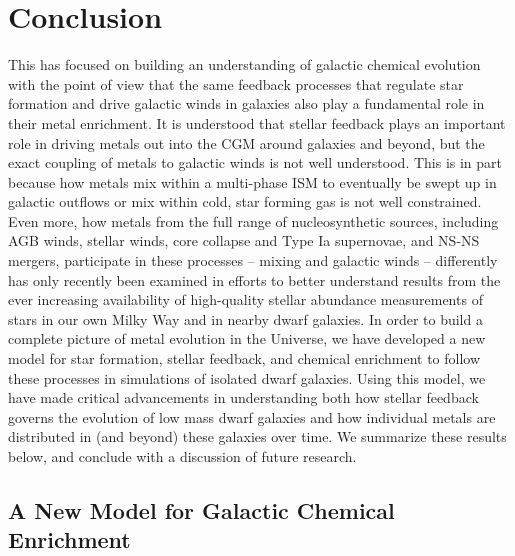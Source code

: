 \chapter[Conclusion]{Conclusion}
\label{ch:conclusion}


This \dissertation has focused on building an understanding of galactic chemical evolution with the point of view that the same feedback processes that regulate star formation and drive galactic winds in galaxies also play a fundamental role in their metal enrichment. It is understood that stellar feedback plays an important role in driving metals out into the CGM around galaxies and beyond, but the exact coupling of metals to galactic winds is not well understood. This is in part because how metals mix within a multi-phase ISM to eventually be swept up in galactic outflows or mix within cold, star forming gas is not well constrained. Even more, how metals from the full range of nucleosynthetic sources, including AGB winds, stellar winds, core collapse and Type Ia supernovae, and NS-NS mergers, participate in these processes -- mixing and galactic winds -- differently has only recently been examined in efforts to better understand results from the ever increasing availability of high-quality stellar abundance measurements of stars in our own Milky Way and in nearby dwarf galaxies. In order to build a complete picture of metal evolution in the Universe, we have developed a new model for star formation, stellar feedback, and chemical enrichment to follow these processes in simulations of isolated dwarf galaxies. Using this model, we have made critical advancements in understanding both how stellar feedback governs the evolution of low mass dwarf galaxies and how individual metals are distributed in (and beyond) these galaxies over time. We summarize these results below, and conclude with a discussion of future research.


\section{A New Model for Galactic Chemical Enrichment}
\label{conclusion:sec:ch1}

